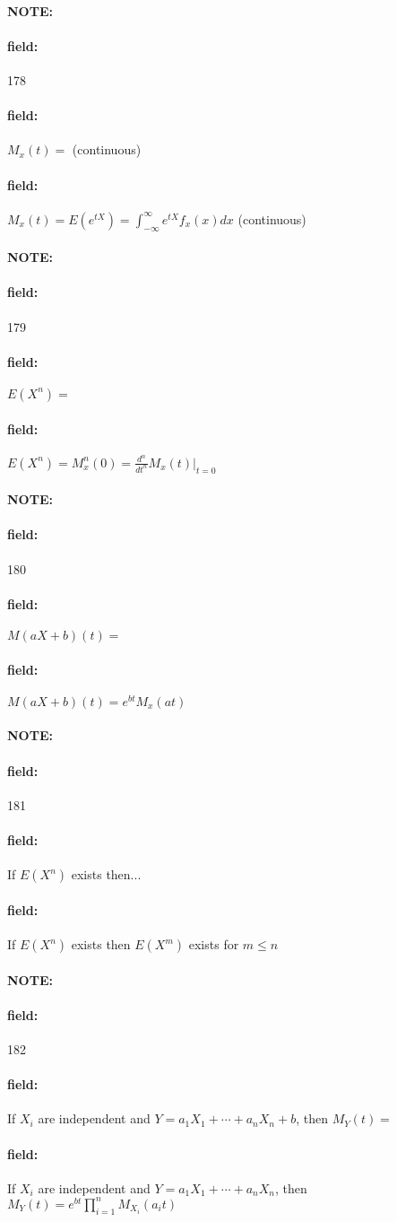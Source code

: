 \documentclass[12pt]{article}
\newenvironment{note}{\paragraph{NOTE:}}{}
\newenvironment{field}{\paragraph{field:}}{}
\begin{document}
\begin{note} \begin{field} \tiny 178 \end{field}
  \begin{field}
    $M_x(t) = $ (continuous)
  \end{field}
  \begin{field}
    $M_x(t) = E(e^{tX}) = \int_{-\infty}^\infty e^{tX}f_x(x)dx$ (continuous)
  \end{field}
\end{note}

\begin{note} \begin{field} \tiny 179 \end{field}
  \begin{field}
    $E(X^n) = $
  \end{field}
  \begin{field}
    $E(X^n) = M_x^n(0) = \frac{d^n}{dt^n}M_x(t)|_{t=0}$
  \end{field}
\end{note}

\begin{note} \begin{field} \tiny 180 \end{field}
  \begin{field}
    $M(aX + b)(t) = $
  \end{field}
  \begin{field}
    $M(aX + b)(t) = e^{bt}M_x(at)$
  \end{field}
\end{note}

\begin{note} \begin{field} \tiny 181 \end{field}
  \begin{field}
    If $E(X^n)$ exists then...
  \end{field}
  \begin{field}
    If $E(X^n)$ exists then $E(X^m)$ exists for $m \leq n$
  \end{field}
\end{note}

\begin{note} \begin{field} \tiny 182 \end{field}
  \begin{field}
    If $X_i$ are independent and $Y = a_1X_1 + \cdots + a_nX_n + b$, then $M_Y(t) = $
  \end{field}
  \begin{field}
    If $X_i$ are independent and $Y = a_1X_1 + \cdots + a_nX_n$, then $M_Y(t) = e^{bt}\prod_{i=1}^n M_{X_i}(a_i t) $
  \end{field}
\end{note}
\end{document}
